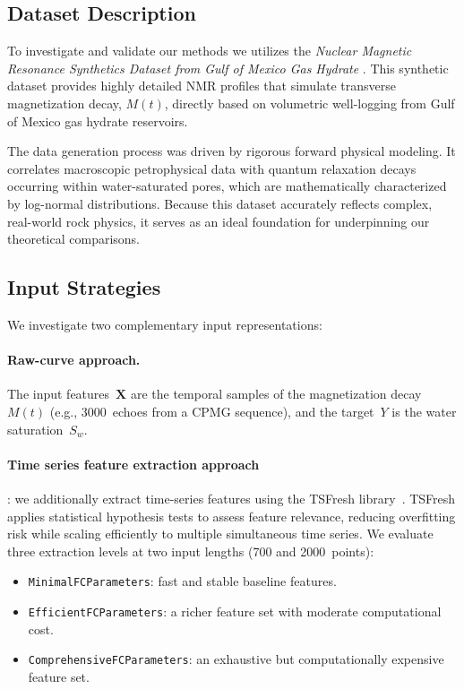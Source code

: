 \documentclass[runningheads]{llncs}
\begin{document}
\subsection{Dataset Description}
\label{subsec:data}

To investigate and validate our methods we utilizes the \textit{Nuclear Magnetic Resonance Synthetics Dataset from Gulf of Mexico Gas Hydrate} \cite{Reis2026}. This synthetic dataset provides highly detailed NMR profiles that simulate transverse magnetization decay, $M(t)$, directly based on volumetric well-logging from Gulf of Mexico gas hydrate reservoirs.

The data generation process was driven by rigorous forward physical modeling. It correlates macroscopic petrophysical data with quantum relaxation decays occurring within water-saturated pores, which are mathematically characterized by log-normal distributions. Because this dataset accurately reflects complex, real-world rock physics, it serves as an ideal foundation for underpinning our theoretical comparisons.


\subsection{Input Strategies}
\label{sec:input}

We investigate two complementary input representations:

\paragraph{Raw-curve approach.}
The input features~$\mathbf{X}$ are the temporal samples of the magnetization decay $M(t)$
(e.g., 3000~echoes from a CPMG sequence), and the target~$Y$ is the water
saturation~$S_w$.

\paragraph{Time series feature extraction approach}: we additionally extract time-series features using the
TSFresh library~\cite{CHRIST201872}. TSFresh applies statistical hypothesis tests to assess
feature relevance, reducing overfitting risk while scaling efficiently to multiple simultaneous
time series. We evaluate three extraction levels at two input lengths (700 and 2000~points):
\begin{itemize}
  \item \texttt{MinimalFCParameters}: fast and stable baseline features.
  \item \texttt{EfficientFCParameters}: a richer feature set with moderate computational cost.
  \item \texttt{ComprehensiveFCParameters}: an exhaustive but computationally expensive feature set.
\end{itemize}
\end{document}
